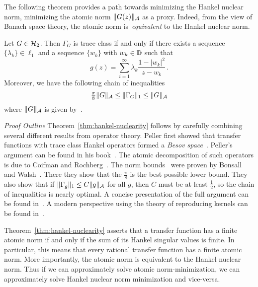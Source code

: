 The following theorem provides a path towards minimizing the Hankel nuclear norm, minimizing the atomic norm $\|G(z)\|_{\mathcal{A}}$ as a proxy.  Indeed, from the view of Banach space theory, the atomic norm is~\emph{equivalent} to the Hankel nuclear norm.

\begin{theorem}\label{thm:hankel-nuclearity}
Let $G \in \mathcal{H}_2$.  Then $\Gamma_G$ is trace class if and only if there exists a sequence $\{\lambda_k\} \in \ell_1$ and a
    sequence $\{w_k\}$ with $w_k \in \mathbb{D}$ such that
\begin{equation}\label{eq:kernel-form}
    g(z) = \sum_{i=1}^\infty \lambda_k \frac{1-|w_k|^2}{z-w_k}\,.
    \end{equation}
Moreover, we have the following chain of inequalities
\begin{equation}\label{eq:norm-ineq-chain}
\tfrac{\pi}{8}\|G\|_{\mathcal{A}} \leq  \|\Gamma_G\|_1 \leq
\|G\|_{\mathcal{A}} 
\end{equation}
where  $\|G\|_{\mathcal{A}}$ is given by~.
\end{theorem}
\emph{Proof Outline}  Theorem~\ref{thm:hankel-nuclearity} follows by carefully combining several different results from operator theory. Peller first showed that transfer functions with trace class Hankel operators formed a \emph{Besov space}~\cite{Peller79}. Peller's argument can be found in his book~\cite{PellerHankelBook}. The atomic decomposition of such operators is due to Coifman and Rochberg~\cite{Coifman80}. The norm bounds~ were proven by Bonsall and Walsh~\cite{Bonsall86}. There they show that the $\tfrac{\pi}{8}$ is the best possible lower bound.  They also show that if $\|\Gamma_g\|_1\leq C\|g\|_{\mathcal{A}}$ for all $g$, then $C$ must be at least $\tfrac{1}{2}$, so the chain of inequalities is nearly optimal. A concise presentation of the full argument can be found  in~\cite{PartingtonHankelBook}. A modern perspective using the theory of reproducing kernels can be found in~\cite{ZhuBook}. 
\vspace{1mm}

\noindent Theorem~\ref{thm:hankel-nuclearity} asserts that a transfer function has a finite atomic norm if and only if the sum of its Hankel singular values is finite.  In particular, this means that every rational transfer function has a finite atomic norm.  More importantly, the atomic norm is equivalent to the Hankel nuclear norm.  Thus if we can approximately solve atomic norm-minimization, we can approximately solve Hankel nuclear norm minimization and vice-versa.

